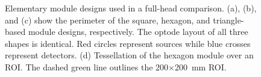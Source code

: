 \begin{figure}
\begin{center}
\end{center}
\caption {Elementary module designs used in a full-head comparison. (a), (b), and (c) show the perimeter of the square, hexagon, and triangle-based module designs, respectively. The optode layout of all three shapes is identical. Red circles represent sources while blue crosses represent detectors. (d) Tessellation of the hexagon module over an ROI. The dashed green line outlines the 200$\times$200~mm ROI.} \label{fig:fullmodules}

\end{figure} 

